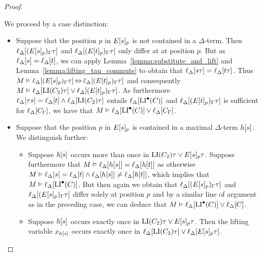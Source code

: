 \documentclass[,%
	draft=false,%
	numbers=noendperiod
	11pt,
	a4paper,
	oneside,%
	openany,
]{memoir}
\begin{document}
\begin{proof}
\begin{description}
			We proceed by a case distinction:
			\begin{itemize}
				\item Suppose that the position $p$ in $E{[s]_{p}}$ is not contained in a $\Delta$-term.
					Then
					$\ell_{\Delta}[(E{[s]_{p}})_\Gamma\tau]$
					and
					$\ell_{\Delta}[(E{[t]_{p}})_\Gamma\tau]$
					only differ at at position $p$.
					But as $\ell_{\Delta}[s] = \ell_{\Delta}[t]$, we can apply Lemma~\ref{lemma:substitute_and_lift} and Lemma~\ref{lemma:lifting_tau_commute} to obtain that 
					$\ell_{\Delta}[s\tau] = \ell_{\Delta}[t\tau]$.
					Thus
					$M\vDash \ell_{\Delta}[(E{[s]_{p}})_\Gamma\tau] \operatorname{\Leftrightarrow} 
					\ell_{\Delta}[(E{[t]_{p}})_\Gamma\tau]$
					and consequently
					$M \vDash \ell_{\Delta}[\operatorname{LI}(C_2)\tau] \lor \ell_{\Delta}[(E{[t]_{p}})_\Gamma\tau]$.
					As furthermore $\ell_{\Delta}[\tau s] =\ell_{\Delta}[t] \land \ell_{\Delta}[\operatorname{LI}(C_2)\tau]$ entails $\ell_{\Delta}[\operatorname{LI}^\bullet(C)]$
					and $\ell_{\Delta}[(E{[t]_{p}})_\Gamma\tau]$ is sufficient for $\ell_{\Delta}[C_\Gamma]$,
					we have that 
					$M\vDash \ell_{\Delta}[\operatorname{LI}^\bullet(C)] \lor \ell_{\Delta}[C_\Gamma]$.

				\item
					Suppose that the position $p$ in $E{[s]_{p}}$ is contained in a maximal $\Delta$-term $h[s]$.
					We distinguish further:

					\begin{itemize}
						\item Suppose $h[s]$ occurs more than once in $\operatorname{LI}(C_2)\tau \lor E{[s]_{p}}\tau$.
							Suppose furthermore that $M \vDash \ell_{\Delta}[h[s]] = \ell_{\Delta}[h[t]]$ as otherwise $M \entails \lifdeltanovar{s}\nolinebreak=\lifdeltanovar{t} \land\allowbreak \lifdeltanovar{h\occ{s}} \neq \lifdeltanovar{h\occ{t}}$, which implies that $M \vDash \ell_{\Delta}[\operatorname{LI}^\bullet(C)]$.
							But then again we obtain that
							$\ell_{\Delta}[(E{[s]_{p}})_\Gamma\tau]$
							and
							$\ell_{\Delta}[(E{[s]_{p}})_\Gamma\tau]$
							differ solely at position $p$ and by a similar line of argument as in the preceding case, we can deduce that $M \vDash \ell_{\Delta}[\operatorname{LI}^\bullet(C)] \lor \ell_{\Delta}[C]$.

						\item Suppose $h[s]$ occurs exactly once in $\operatorname{LI}(C_2)\tau \lor E{[s]_{p}}\tau$.
							Then the lifting variable $x_{h[s]}$ 
							occurs exactly once in $\ell_{\Delta}[\operatorname{LI}(C_2)\tau] \lor \ell_{\Delta}[E{[s]_{p}}\tau]$.


\end{itemize}
\end{itemize}
\end{description}
\end{proof}
\end{document}
